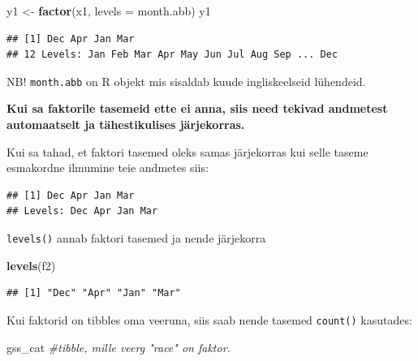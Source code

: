 \documentclass[]{book}
\newenvironment{Shaded}{\begin{snugshade}}{\end{snugshade}}
\newcommand{\KeywordTok}[1]{\textcolor[rgb]{0.13,0.29,0.53}{\textbf{#1}}}
\newcommand{\DataTypeTok}[1]{\textcolor[rgb]{0.13,0.29,0.53}{#1}}
\newcommand{\StringTok}[1]{\textcolor[rgb]{0.31,0.60,0.02}{#1}}
\newcommand{\CommentTok}[1]{\textcolor[rgb]{0.56,0.35,0.01}{\textit{#1}}}
\newcommand{\OperatorTok}[1]{\textcolor[rgb]{0.81,0.36,0.00}{\textbf{#1}}}
\newcommand{\NormalTok}[1]{#1}
\begin{document}
\begin{Shaded}
\begin{Highlighting}[]
\NormalTok{y1 <-}\StringTok{ }\KeywordTok{factor}\NormalTok{(x1, }\DataTypeTok{levels =}\NormalTok{ month.abb)}
\NormalTok{y1}
\end{Highlighting}
\end{Shaded}

\begin{verbatim}
## [1] Dec Apr Jan Mar
## 12 Levels: Jan Feb Mar Apr May Jun Jul Aug Sep ... Dec
\end{verbatim}

NB! \texttt{month.abb} on R objekt mis sisaldab kuude ingliskeelseid
lühendeid.

\textbf{Kui sa faktorile tasemeid ette ei anna, siis need tekivad
andmetest automaatselt ja tähestikulises järjekorras.}

Kui sa tahad, et faktori tasemed oleks samas järjekorras kui selle
taseme esmakordne ilmumine teie andmetes siis:

\begin{Shaded}
\end{Shaded}

\begin{verbatim}
## [1] Dec Apr Jan Mar
## Levels: Dec Apr Jan Mar
\end{verbatim}

\texttt{levels()} annab faktori tasemed ja nende järjekorra

\begin{Shaded}
\begin{Highlighting}[]
\KeywordTok{levels}\NormalTok{(f2)}
\end{Highlighting}
\end{Shaded}

\begin{verbatim}
## [1] "Dec" "Apr" "Jan" "Mar"
\end{verbatim}

Kui faktorid on tibbles oma veeruna, siis saab nende tasemed
\texttt{count()} kasutades:

\begin{Shaded}
\begin{Highlighting}[]
\NormalTok{gss_cat }\CommentTok{#tibble, mille veerg "race" on faktor.}
\end{Highlighting}
\end{Shaded}
\end{document}

